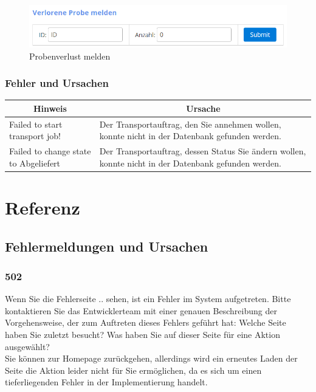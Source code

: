\documentclass[enabledeprecatedfontcommands,fontsize=12pt,paper=a4,twoside]{scrartcl}
\begin{document}
\begin{figure}[h!]
\begin{center}
 \includegraphics[width=\textwidth]{screenshots/tr/verloren.png}
  \caption{Probenverlust melden}
  \label{fig:boat2}
\end{center}
\end{figure}

\subsubsection{Fehler und Ursachen}
\begin{longtable}[c]{|p{5cm}|p{10cm}|}
\hline
\multicolumn{1}{|c|}{\textbf{Hinweis}}                          & \multicolumn{1}{c|}{\textbf{Ursache}}                                                                                                                                                                                                               \\ \hline
\endhead
Failed to start transport job! & Der Transportauftrag, den Sie annehmen wollen, konnte nicht in der Datenbank gefunden werden. \\ \hline
Failed to change state to Abgeliefert & Der Transportauftrag, dessen Status Sie ändern wollen, konnte nicht in der Datenbank gefunden werden.\\ \hline
\end{longtable}

\newpage
\section{Referenz}
\subsection{Fehlermeldungen und Ursachen}
\subsubsection{502}
Wenn Sie die Fehlerseite .. sehen, ist ein Fehler im System aufgetreten. Bitte kontaktieren Sie das Entwicklerteam mit einer genauen Beschreibung der Vorgehensweise, der zum Auftreten dieses Fehlers geführt hat: Welche Seite haben Sie zuletzt besucht? Was haben Sie auf dieser Seite für eine Aktion ausgewählt? \\
Sie können zur Homepage zurückgehen, allerdings wird ein erneutes Laden der Seite die Aktion leider nicht für Sie ermöglichen, da es sich um einen tieferliegenden Fehler in der Implementierung handelt. \\
\end{document}
